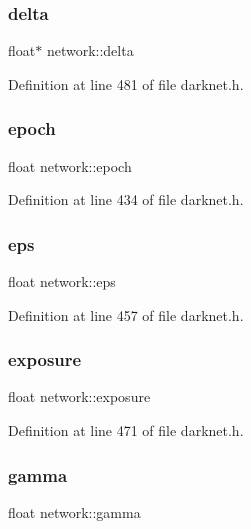 \subsubsection{\texorpdfstring{delta}{delta}}
{\footnotesize\ttfamily float$\ast$ network\+::delta}



Definition at line 481 of file darknet.\+h.

\mbox{\label{structnetwork_a7b16b097d1814258e82b58d663692875}} 
\subsubsection{\texorpdfstring{epoch}{epoch}}
{\footnotesize\ttfamily float network\+::epoch}



Definition at line 434 of file darknet.\+h.

\mbox{\label{structnetwork_a13a150c894a1f34f08b7f8dff7808ea7}} 
\subsubsection{\texorpdfstring{eps}{eps}}
{\footnotesize\ttfamily float network\+::eps}



Definition at line 457 of file darknet.\+h.

\mbox{\label{structnetwork_a609572db2c14c55c6c261844cb33fa12}} 
\subsubsection{\texorpdfstring{exposure}{exposure}}
{\footnotesize\ttfamily float network\+::exposure}



Definition at line 471 of file darknet.\+h.

\mbox{\label{structnetwork_a5460d67e44c0877ca016ed12925788fe}} 
\subsubsection{\texorpdfstring{gamma}{gamma}}
{\footnotesize\ttfamily float network\+::gamma}



